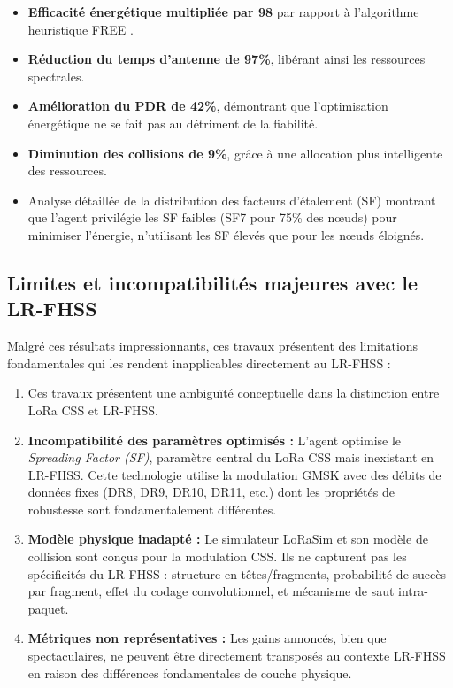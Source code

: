 \begin{itemize}
	\item \textbf{Efficacité énergétique multipliée par 98} par rapport à l'algorithme heuristique FREE \cite{free}.
	\item \textbf{Réduction du temps d'antenne de 97\%}, libérant ainsi les ressources spectrales.
	\item \textbf{Amélioration du PDR de 42\%}, démontrant que l'optimisation énergétique ne se fait pas au détriment de la fiabilité.
	\item \textbf{Diminution des collisions de 9\%}, grâce à une allocation plus intelligente des ressources.
	\item Analyse détaillée de la distribution des facteurs d'étalement (SF) montrant que l'agent privilégie les SF faibles (SF7 pour 75\% des nœuds) pour minimiser l'énergie, n'utilisant les SF élevés que pour les nœuds éloignés.
\end{itemize}

\subsection{Limites et incompatibilités majeures avec le LR-FHSS}

Malgré ces résultats impressionnants, ces travaux présentent des limitations fondamentales qui les rendent inapplicables directement au LR-FHSS :

\begin{enumerate}
	\item Ces travaux présentent une ambiguïté conceptuelle dans la distinction entre LoRa CSS et LR-FHSS.
	\item \textbf{Incompatibilité des paramètres optimisés :} L'agent optimise le \textit{Spreading Factor (SF)}, paramètre central du LoRa CSS mais inexistant en LR-FHSS. Cette technologie utilise la modulation GMSK avec des débits de données fixes (DR8, DR9, DR10, DR11, etc.) dont les propriétés de robustesse sont fondamentalement différentes.
	
	\item \textbf{Modèle physique inadapté :} Le simulateur LoRaSim et son modèle de collision sont conçus pour la modulation CSS. Ils ne capturent pas les spécificités du LR-FHSS : structure en-têtes/fragments, probabilité de succès par fragment, effet du codage convolutionnel, et mécanisme de saut intra-paquet.
	
	\item \textbf{Métriques non représentatives :} Les gains annoncés, bien que spectaculaires, ne peuvent être directement transposés au contexte LR-FHSS en raison des différences fondamentales de couche physique.
\end{enumerate}

